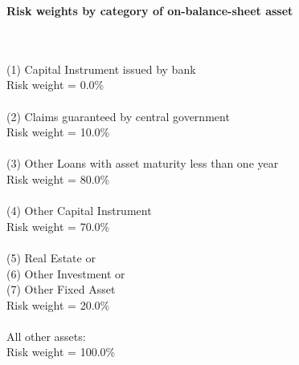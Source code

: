 \documentclass{article}
\begin{document}
\setlength{\parindent}{0em}
\begin{center}{\bf Risk weights by category of on-balance-sheet asset}\end{center}
~\\
~\\

(1) Capital Instrument issued by bank \\
Risk weight = 0.0\%\\

~\\
(2) Claims guaranteed by central government \\
Risk weight = 10.0\%\\

~\\
(3) Other Loans with asset maturity less than one year \\
Risk weight = 80.0\%\\

~\\
(4) Other Capital Instrument\\
Risk weight = 70.0\%\\

~\\
(5) Real Estate or \\
(6) Other Investment or \\
(7) Other Fixed Asset\\
Risk weight = 20.0\%\\

~\\
All other assets:\\
Risk weight = 100.0\%\\

~\\
\end{document}
